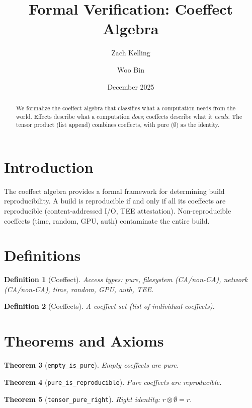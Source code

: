 \documentclass[11pt]{article}
\title{Formal Verification: Coeffect Algebra}
\author{Zach Kelling \and Woo Bin}
\date{December 2025}
\newtheorem{theorem}{Theorem}
\newtheorem{definition}[theorem]{Definition}
\begin{document}
\maketitle

\begin{abstract}
We formalize the coeffect algebra that classifies what a computation needs from the world. Effects describe what a computation \emph{does}; coeffects describe what it \emph{needs}. The tensor product (list append) combines coeffects, with pure ($\emptyset$) as the identity.
\end{abstract}

\section{Introduction}
The coeffect algebra provides a formal framework for determining build reproducibility. A build is reproducible if and only if all its coeffects are reproducible (content-addressed I/O, TEE attestation). Non-reproducible coeffects (time, random, GPU, auth) contaminate the entire build.

\section{Definitions}
\begin{definition}[Coeffect]
Access types: pure, filesystem (CA/non-CA), network (CA/non-CA), time, random, GPU, auth, TEE.
\end{definition}

\begin{definition}[Coeffects]
A coeffect set (list of individual coeffects).
\end{definition}


\section{Theorems and Axioms}
\begin{theorem}[\texttt{empty\_is\_pure}]
Empty coeffects are pure.
\end{theorem}

\begin{theorem}[\texttt{pure\_is\_reproducible}]
Pure coeffects are reproducible.
\end{theorem}

\begin{theorem}[\texttt{tensor\_pure\_right}]
Right identity: $r \otimes \emptyset = r$.
\end{theorem}
\end{document}
